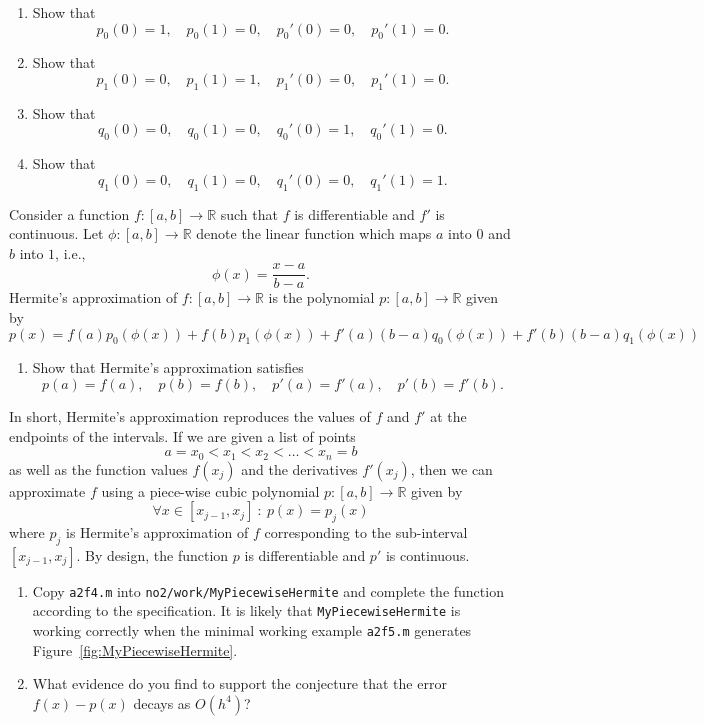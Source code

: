 \documentclass[a4paper,12pt]{article}
\newcommand{\R}{\mathbb{R}}
\newcommand{\bes}{\begin{equation*}}
\newcommand{\ees}{\end{equation*}}
\newcommand{\be}{\begin{equation}}
\newcommand{\ee}{\end{equation}}
\begin{document}
 \begin{enumerate}
 \item Show that
   \be
   p_0(0) = 1, \quad p_0(1) = 0, \quad p_0'(0) = 0, \quad p_0'(1) = 0.
   \ee
 \item Show that
   \be
   p_1(0) = 0, \quad p_1(1) = 1, \quad p_1'(0) = 0, \quad p_1'(1) = 0.
   \ee
  \item Show that
   \be
   q_0(0) = 0, \quad q_0(1) = 0, \quad q_0'(0) = 1, \quad q_0'(1) = 0.
   \ee
 \item Show that
   \be
   q_1(0) = 0, \quad q_1(1) = 0, \quad q_1'(0) = 0, \quad q_1'(1) = 1.
   \ee
 \end{enumerate}
 Consider a function $f : [a,b] \rightarrow \R$ such that $f$ is differentiable and $f'$ is continuous. Let $\phi : [a,b] \rightarrow \R$ denote the linear function which maps $a$ into $0$ and $b$ into $1$, i.e.,
 \be
 \phi(x) = \frac{x - a}{b-a}.
 \ee
 Hermite's approximation of $f : [a,b] \rightarrow \R$ is the polynomial $p : [a,b] \rightarrow \R$ given by
 \be
 p(x)  = f(a) p_0(\phi(x)) + f(b) p_1(\phi(x)) + f'(a) (b-a) q_0(\phi(x)) + f'(b) (b-a) q_1(\phi(x))
 \ee
 \begin{enumerate}[resume]
 \item Show that Hermite's approximation satisfies
   \be
   p(a) = f(a), \quad p(b) = f(b), \quad p'(a) = f'(a), \quad p'(b) = f'(b).
   \ee
 \end{enumerate}
 In short, Hermite's approximation reproduces the values of $f$ and $f'$ at the endpoints of the intervals. If we are given a list of points
 \bes
 a= x_0 < x_1 < x_2 < \dots < x_n = b
 \ees
 as well as the function values $f(x_j)$ and the derivatives $f'(x_j)$, then we can approximate $f$ using a piece-wise cubic polynomial $p : [a,b] \rightarrow \R$ given by
 \be
\forall x \in [x_{j-1},x_j] \: : \: p(x) = p_j(x)
 \ee
 where $p_j$ is Hermite's approximation of $f$ corresponding to the sub-interval $[x_{j-1}, x_j]$. By design, the function $p$ is differentiable and $p'$ is continuous.
\begin{enumerate}[resume] 
 \item Copy {\tt a2f4.m} into {\tt no2/work/MyPiecewiseHermite} and complete the function according to the specification. It is likely that {\tt MyPiecewiseHermite} is working correctly when the minimal working example {\tt a2f5.m} generates Figure~\ref{fig:MyPiecewiseHermite}.

 \item What evidence do you find to support the conjecture that the error $f(x) - p(x)$ decays as $O(h^4)$?
 \end{enumerate}
\end{document}
